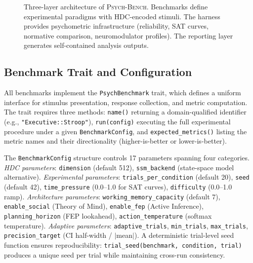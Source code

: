 \documentclass[11pt,letterpaper]{article}
\newcommand{\bind}{\otimes}
\newcommand{\symthaea}{\textsc{Symthaea}}
\newcommand{\psychbench}{\textsc{Psych-Bench}}
\begin{document}
\begin{figure}[t]
\caption{Three-layer architecture of \psychbench{}. Benchmarks define experimental paradigms with HDC-encoded stimuli. The harness provides psychometric infrastructure (reliability, SAT curves, normative comparison, neuromodulator profiles). The reporting layer generates self-contained analysis outputs.}
\label{fig:architecture}
\end{figure}

\subsection{Benchmark Trait and Configuration}

All benchmarks implement the \texttt{PsychBenchmark} trait, which defines a uniform interface for stimulus presentation, response collection, and metric computation. The trait requires three methods: \texttt{name()} returning a domain-qualified identifier (e.g., \texttt{"Executive::Stroop"}), \texttt{run(config)} executing the full experimental procedure under a given \texttt{BenchmarkConfig}, and \texttt{expected\_metrics()} listing the metric names and their directionality (higher-is-better or lower-is-better).

The \texttt{BenchmarkConfig} structure controls 17 parameters spanning four categories. \emph{HDC parameters}: \texttt{dimension} (default 512), \texttt{ssm\_backend} (state-space model alternative). \emph{Experimental parameters}: \texttt{trials\_per\_condition} (default 20), \texttt{seed} (default 42), \texttt{time\_pressure} (0.0--1.0 for SAT curves), \texttt{difficulty} (0.0--1.0 ramp). \emph{Architecture parameters}: \texttt{working\_memory\_capacity} (default 7), \texttt{enable\_social} (Theory of Mind), \texttt{enable\_fep} (Active Inference), \texttt{planning\_horizon} (FEP lookahead), \texttt{action\_temperature} (softmax temperature). \emph{Adaptive parameters}: \texttt{adaptive\_trials}, \texttt{min\_trials}, \texttt{max\_trials}, \texttt{precision\_target} (CI half-width / $|$mean$|$). A deterministic trial-level seed function ensures reproducibility: \texttt{trial\_seed(benchmark, condition, trial)} produces a unique seed per trial while maintaining cross-run consistency.
\end{document}
